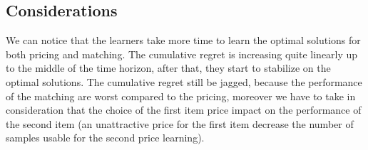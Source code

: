 \subsection*{Considerations}
We can notice that the learners take more time to learn the optimal solutions for both pricing and matching. The cumulative regret is increasing quite linearly up to the middle of the time horizon, after that, they start to stabilize on the optimal solutions. The cumulative regret still be jagged, because the performance of the matching are worst compared to the pricing, moreover we have to take in consideration that the choice of the first item price impact on the performance of the second item (an unattractive price for the first item decrease the number of samples usable for the second price learning).
